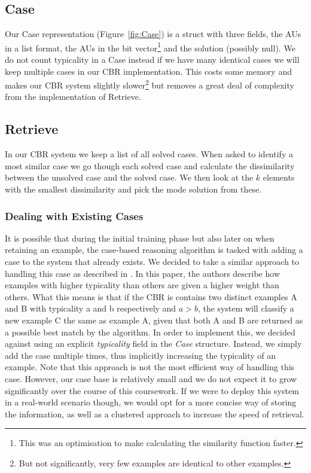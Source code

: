 \documentclass[10pt,a4paper]{article}
\begin{document}
\subsection{Case}
Our Case representation (Figure~\ref{fig:Case}) is a struct with three fields, the AUs in a list format,
the AUs in the bit vector\footnote{This was an optimisation to make calculating the similarity function faster.} and the solution (possibly null).
We do not count typicality in a Case instead if we have many identical cases we will keep multiple cases in our CBR implementation.
This costs some memory and makes our CBR system slightly slower\footnote{But not significantly, very few examples are identical to other examples.} but removes a great deal of complexity from the implementation of Retrieve.

\subsection{Retrieve}
In our CBR system we keep a list of all solved cases.
When asked to identify a most similar case we go though each solved case and calculate the dissimilarity between the unsolved case and the solved case.
We then look at the $k$ elements with the smallest dissimilarity and pick the mode solution from these.

\subsubsection{Dealing with Existing Cases}
It is possible that during the initial training phase but also later on when retaining an example, the case-based reasoning algorithm is tasked with adding a case to the system that already exists. We decided to take a similar approach to handling this case as described in \cite{Pantic2004}. In this paper, the authors describe how examples with higher typicality than others are given a higher weight than others. What this means is that if the CBR is contains two distinct examples A and B with typicality a and b respectively and $a > b$, the system will classify a new example C the same as example A, given that both A and B are returned as a possible best match by the algorithm.
In order to implement this, we decided against using an explicit \emph{typicality} field in the \emph{Case} structure. Instead, we simply add the case multiple times, thus implicitly increasing the typicality of an example. Note that this approach is not the most efficient way of handling this case. However, our case base is relatively small and we do not expect it to grow significantly over the course of this coursework. If we were to deploy this system in a real-world scenario though, we would opt for a more concise way of storing the information, as well as a clustered approach to increase the speed of retrieval.
\end{document}
